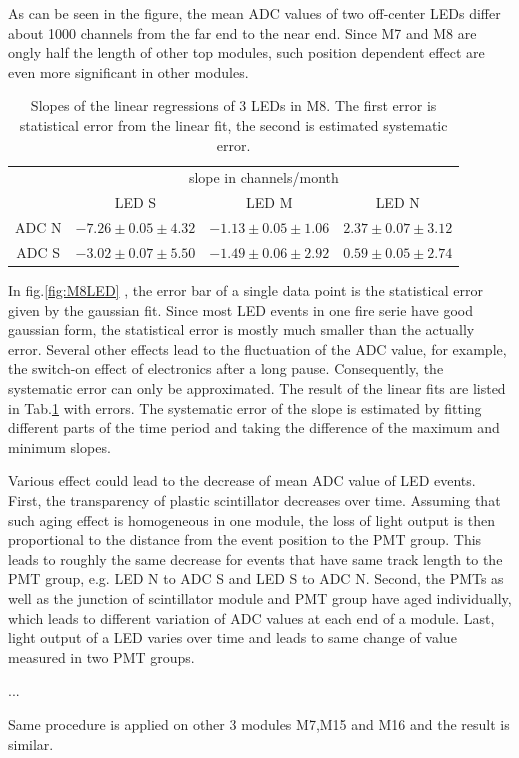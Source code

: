 As can be seen in the figure, the mean ADC values of two off-center LEDs differ about 1000 channels from the far end to the near end. Since M7 and M8 are ongly half the length of other top modules, such position dependent effect are even more significant in other modules.


\begin{table}[hb]
  \centering
  \caption{Slopes of the linear regressions of 3 LEDs in M8. The first error is statistical error from the linear fit, the second is estimated systematic error. }
  \label{tab:led}
  \begin{tabular}{c c c c}
  \toprule
        & \multicolumn{3}{c}{slope in channels/month} \\
        & LED S   & LED M  & LED N \\
  \midrule
  ADC N & $-7.26\pm0.05\pm4.32$ & $-1.13\pm0.05\pm1.06$ & $2.37\pm0.07\pm3.12$  \\
  ADC S & $-3.02\pm0.07\pm5.50$ & $-1.49\pm0.06\pm2.92$ & $0.59\pm0.05\pm2.74$  \\
  \bottomrule
  \end{tabular}

\end{table}

In fig.\ref{fig:M8LED} , the error bar of a single data point is the statistical error given by the gaussian fit. Since most LED events in one fire serie have good gaussian form, the statistical error is mostly much smaller than the actually error. Several other effects lead to the fluctuation of the ADC value, for example, the switch-on effect of electronics after a long pause. Consequently, the systematic error can only be approximated. The result of the linear fits are listed in Tab.\ref{tab:led} with errors. The systematic error of the slope is estimated by fitting different parts of the time period and taking the difference of the maximum and minimum slopes.

Various effect could lead to the decrease of mean ADC value of LED events. First, the transparency of plastic scintillator decreases over time. Assuming that such aging effect is homogeneous in one module, the loss of light output is then proportional to the distance from the event position to the PMT group. This leads to roughly the same decrease for events that have same track length to the PMT group, e.g. LED N to ADC S and LED S to ADC N. Second, the PMTs as well as the junction of scintillator module and PMT group have aged individually, which leads to different variation of ADC values at each end of a module. Last, light output of a LED varies over time and leads to same change of value measured in two PMT groups.

...



Same procedure is applied on other 3 modules M7,M15 and M16 and the result is similar.
